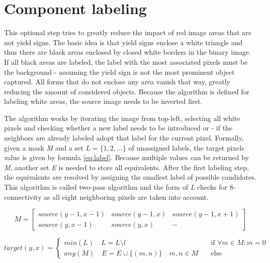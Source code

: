\documentclass{report}
\begin{document}
{\color{red}{Picture examples}}


\section{Component labeling}

This optional step tries to greatly reduce the impact of red image
areas that are not yield signs. The basic idea is that yield signs
enclose a white triangle and thus there are black areas enclosed by
closed white borders in the binary image. If all black areas are
labeled, the label with the most associated pixels must be the
background - assuming the yield sign is not the most prominent object
captured. All forms that do not enclose any area vanish that way,
greatly reducing the amount of considered objects. Because the
algorithm is defined for labeling white areas, the source image needs
to be inverted first.

The algorithm works by iterating the image from top-left, selecting
all white pixels and checking whether a new label needs to be
introduced or - if the neighbors are already labeled adopt that label
for the current pixel. Formally, given a mask \textit{M} and a set \(
L = \{1, 2, ... \} \) of unassigned labels, the target pixels value is
given by formula \ref{eq:label}. Because multiple values can be
returned by \textit{M}, another set \textit{E} is needed to store all
equivalents. After the first labeling step, the equivalents are
resolved by assigning the smallest label of possible candidates. This
algorithm is called two-pass algorithm and the form of \textit{L}
checks for 8-connectivity as all eight neighboring pixels are taken
into account.

\begin{equation}
  M = \begin{bmatrix}
    source(y-1, x-1) & source(y-1, x) & source(y-1, x+1) \\
    source(y, x-1)   & source(y, x)   & -
  \end{bmatrix}
\end{equation}


\begin{equation}\label{eq:label}
    target(y, x) =
    \begin{cases}
      min(L) \quad L = L \setminus l & \quad \text{if } \forall m \in M: m = 0 \\
      any(M) \quad E = E \cup \{(m, n)\} \quad m, n \in M & \quad \text{else}
    \end{cases}
\end{equation}
\end{document}
